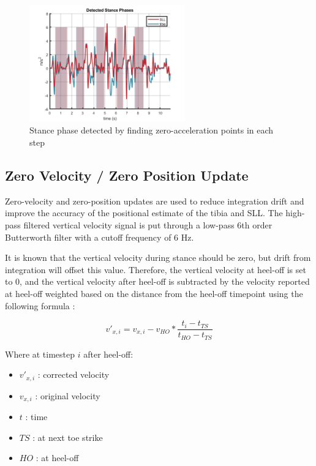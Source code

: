 \documentclass[defaultstyle,11pt]{comps}
\providecommand{\tightlist}{%
  \setlength{\itemsep}{0pt}\setlength{\parskip}{0pt}}
\begin{document}
\begin{figure}
\hypertarget{fig:SA1-Stance}{%
\centering
\includegraphics[width=0.6\textwidth,height=\textheight]{../fig/SA1/S3C0T1R_Stance.png}
\caption{Stance phase detected by finding zero-acceleration points in each step}\label{fig:SA1-Stance}
}
\end{figure}

\hypertarget{zero-velocity-zero-position-update}{%
\subsection{Zero Velocity / Zero Position Update}\label{zero-velocity-zero-position-update}}

Zero-velocity and zero-position updates are used to reduce integration drift and improve the accuracy of the positional estimate of the tibia and SLL.
The high-pass filtered vertical velocity signal is put through a low-pass 6th order Butterworth filter with a cutoff frequency of 6 Hz.

It is known that the vertical velocity during stance should be zero, but drift from integration will offset this value.
Therefore, the vertical velocity at heel-off is set to 0, and the vertical velocity after heel-off is subtracted by the velocity reported at heel-off weighted based on the distance from the heel-off timepoint using the following formula \citep{Feliz2009}:

\[
v'_{x,i} = v_{x,i} - v_{HO}*\frac{t_{i}-t_{TS}}{t_{HO}-t_{TS}}
\]

Where at timestep \(i\) after heel-off:

\begin{itemize}
\tightlist
\item
  \(v'_{x,i}\) : corrected velocity
\item
  \(v_{x,i}\) : original velocity
\item
  \(t\) : time
\item
  \(TS\) : at next toe strike
\item
  \(HO\) : at heel-off
\end{itemize}
\end{document}
